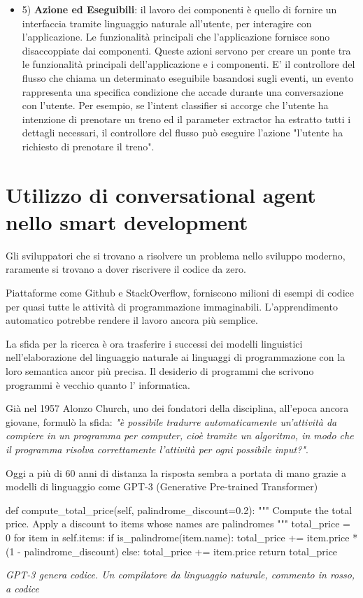 \begin{itemize}
    \item 5) \textbf{Azione ed Eseguibili}: il lavoro dei componenti è quello di fornire un interfaccia tramite linguaggio naturale all'utente, per interagire con l'applicazione. Le funzionalità principali che l'applicazione fornisce sono disaccoppiate dai componenti. Queste azioni servono per creare un ponte tra le funzionalità principali dell'applicazione e i componenti. E' il controllore del flusso che chiama un determinato eseguibile basandosi sugli eventi, un evento rappresenta una specifica condizione che accade durante una conversazione con l'utente. Per esempio, se l'intent classifier si accorge che l'utente ha intenzione di prenotare un treno ed il parameter extractor ha estratto tutti i dettagli necessari, il controllore del flusso può eseguire l'azione "l'utente ha richiesto di prenotare il treno".\cite{srivastava2019reference}
    \end{itemize}\pagebreak
    
\section{Utilizzo di conversational agent nello smart development}
Gli sviluppatori che si trovano a risolvere un problema nello sviluppo moderno, raramente si trovano a dover riscrivere il codice da zero.

Piattaforme come Github e StackOverflow, forniscono milioni di esempi di codice per quasi tutte le attività di programmazione immaginabili. L'apprendimento automatico potrebbe rendere il lavoro ancora più semplice.

La sfida per la ricerca è ora trasferire i  successi dei modelli linguistici nell'elaborazione del linguaggio naturale ai linguaggi di programmazione con la loro semantica ancor più precisa. Il desiderio di programmi che scrivono programmi è vecchio quanto  l' informatica. \cite{finkbeiner2021kunstliche} 

Già nel 1957 Alonzo Church, uno dei fondatori della disciplina, all'epoca ancora giovane, formulò la sfida: \textit{"è possibile tradurre automaticamente un'attività da compiere in un programma per computer, cioè tramite un algoritmo, in modo che il programma risolva correttamente l'attività per ogni possibile input?"}. 

Oggi a più di 60 anni di distanza la risposta sembra a portata di mano grazie a modelli di linguaggio come GPT-3 (Generative Pre-trained Transformer)\cite{chintala_2020}\bigbreak
\begin{python}
def compute_total_price(self, palindrome_discount=0.2):
    """
    Compute the total price.
    Apply a discount to items whose names are palindromes
    """
    total_price = 0
    for item in self.items:
       if is_palindrome(item.name):
          total_price += item.price * (1 - palindrome_discount)
       else:
          total_price += item.price
    return total_price
    
\end{python}
\textit{GPT-3 genera codice. Un compilatore da linguaggio naturale, commento in rosso, a codice} \cite{crivello_2020}

